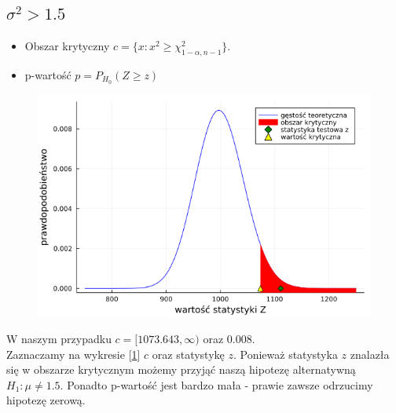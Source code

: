 \documentclass{article}
\theoremstyle{break}
\begin{document}
\subsection*{$\sigma^2  > 1.5$}	
\begin{itemize}
	\item Obszar krytyczny $c=\{x: x^2\geq \chi^2_{1-\alpha,n-1}\}$.
	\item p-wartość $p=P_{H_0}(Z\geq z)$
\end{itemize}
\begin{figure}[H]
	\begin{center}
		\includegraphics[scale=0.5]{Z2.2.png}
		\caption{}
		\label{fig:5}
	\end{center}
\end{figure}
W naszym przypadku $c=[1073.643,\infty)$ oraz $0.008$.\\
Zaznaczamy na wykresie [\ref{fig:5}]  $c$ oraz statystykę $z$. Ponieważ statystyka $z$ znalazła się w obszarze krytycznym możemy przyjąć naszą hipotezę alternatywną $H_1: \mu \ne 1.5$. Ponadto p-wartość jest bardzo mała - prawie zawsze odrzucimy hipotezę zerową.
\end{document}

